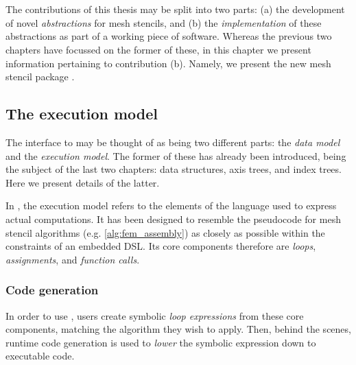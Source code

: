 \documentclass[thesis]{subfiles}
\begin{document}

\chapter{}
\label{chapter:pyop3}

The contributions of this thesis may be split into two parts:
(a) the development of novel \emph{abstractions} for mesh stencils, and
(b) the \emph{implementation} of these abstractions as part of a working piece of software.
Whereas the previous two chapters have focussed on the former of these, in this chapter we present information pertaining to contribution (b).
Namely, we present the new mesh stencil package .

\section{The execution model}

The interface to  may be thought of as being two different parts: the \emph{data model} and the \emph{execution model}.
The former of these has already been introduced, being the subject of the last two chapters: data structures, axis trees, and index trees.
Here we present details of the latter.

In , the execution model refers to the elements of the language used to express actual computations.
It has been designed to resemble the pseudocode for mesh stencil algorithms (e.g. \cref{alg:fem_assembly}) as closely as possible within the constraints of an embedded DSL.
Its core components therefore are \emph{loops}, \emph{assignments}, and \emph{function calls}.

\subsection{Code generation}

In order to use , users create symbolic \emph{loop expressions} from these core components, matching the algorithm they wish to apply.
Then, behind the scenes, runtime code generation is used to \emph{lower} the symbolic expression down to executable code.
\end{document}
